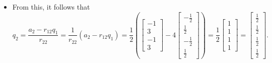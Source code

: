 \documentclass[letterpaper]{article}
\newcommand{\0}{\mathbf{0}}
\begin{document}
\begin{mdframed}
\begin{mdframed}
\begin{itemize}
\begin{equation*}
\begin{aligned}
\begin{bmatrix}
                        \end{bmatrix} \right|\right|_2 = \left|\left| \begin{bmatrix}
                            -1 \\ 3 \\ -1 \\ 3
                        \end{bmatrix} - \begin{bmatrix}
                            -2 \\ 2 \\ -2 \\ 2
                        \end{bmatrix} \right|\right|_2 \\ 
                        &= \left|\left| \begin{bmatrix}
                            1 \\ 1 \\ 1 \\ 1
                        \end{bmatrix} \right|\right|_2 = \sqrt{1^2 + 1^2 + 1^2 + 1^2} = \sqrt{4} = 2.
                \end{aligned}
            \end{equation*}
            \item From this, it follows that 
            \[q_2 = \frac{a_2 - r_{12} q_1}{r_{22}} = \frac{1}{r_{22}}(a_2 - r_{12} q_1) = \frac{1}{2}\left(\begin{bmatrix}
                -1 \\ 3 \\ -1 \\ 3
            \end{bmatrix} - 4 \begin{bmatrix}
                -\frac{1}{2} \\ \frac{1}{2} \\ -\frac{1}{2} \\ \frac{1}{2}
            \end{bmatrix}\right) = \frac{1}{2}\begin{bmatrix}
                1 \\ 1 \\ 1 \\ 1
            \end{bmatrix} = \begin{bmatrix}
                \frac{1}{2} \\ \frac{1}{2} \\ \frac{1}{2} \\ \frac{1}{2}
            \end{bmatrix}.\]
        \end{itemize}
    \end{mdframed}


\end{mdframed}
\end{document}
